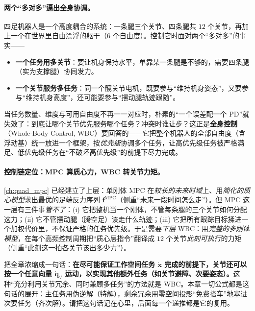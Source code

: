 \paragraph{两个“多对多”逼出全身协调。}
四足机器人是一个高度耦合的系统：一条腿三个关节、四条腿共 $12$ 个关节，再加上一个在世界里自由漂浮的躯干（$6$ 个自由度）。控制它时面对两个“多对多”的事实——
\begin{itemize}
  \item \textbf{一个任务用多关节}：要让机身保持水平，单靠某一条腿是不够的，需要四条腿（实为支撑腿）协同发力。
  \item \textbf{一个关节服务多任务}：同一个髋关节电机，既要参与“维持机身姿态”，又要参与“维持机身高度”，还可能要参与“摆动腿轨迹跟随”。
\end{itemize}
当任务数量、维度与可用自由度不再一一对应时，朴素的“一个误差配一个 PD”就失效了：到底让哪个关节优先服务哪个任务？冲突时谁让步？这正是\textbf{全身控制}（Whole-Body Control, WBC）要回答的——它把整个机器人的全部自由度（含浮动基）统一放进一个框架，按\emph{优先级}协调多个任务，让高优先级任务被严格满足、低优先级任务在“不破坏高优先级”的前提下尽力完成\cite{yu2021quadruped}。

\paragraph{控制链定位：MPC 算质心力，WBC 转关节力矩。}
\cref{ch:quad_mpc} 已经建立了上层：单刚体 MPC 在\emph{较长的未来时域}上、用\emph{简化的质心模型}求出最优的足端反力序列 $\boldsymbol{f}^{\mathrm{MPC}}$（侧重“未来一段时间怎么走”）。但 MPC 这一层有三件事\emph{管不了}：(i) 它把整机当一个刚体，不管每条腿的三个关节如何分配这力；(ii) 它不管摆动腿（腾空足）该走什么轨迹；(iii) 它把所有跟踪目标揉进一个加权代价里，不保证严格的任务优先级。于是需要\emph{下层} WBC：用\emph{完整的多刚体模型}，在每个高频控制周期把“质心层指令”翻译成 $12$ 个关节\emph{此刻可执行}的力矩（侧重“此刻这一拍各关节该出多少力”）。

\begin{insight}\label{ins:qw-wbc-def}
把全章浓缩成一句话：\textbf{在尽可能保证工作空间任务 $\dot{\boldsymbol{x}}$ 完成的前提下，关节还可以按一个任意向量 $\dot{\boldsymbol{q}}_{\forall}$ 运动，以实现其他额外任务（如关节避障、次要姿态）。}这种“充分利用关节冗余、同时兼顾多任务”的方法就是 WBC。本章一切公式都是这句话的展开：主任务用伪逆解（特解），剩余冗余用零空间投影“免费搭车”地塞进次要任务（齐次解）。请把这句话记在心里，后面每一个递推都是它的复用。
\end{insight}


